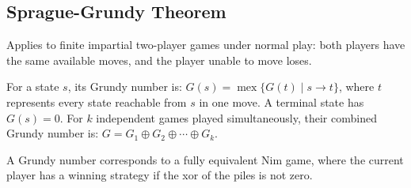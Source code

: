 \subsection{Sprague-Grundy Theorem}
Applies to finite impartial two-player games under normal play: both players have
the same available moves, and the player unable to move loses.

For a state $s$, its Grundy number is: $G(s) = \operatorname{mex}\{G(t) \mid s \rightarrow t\}$,
where $t$ represents every state reachable from $s$ in one move. A terminal state has $G(s) = 0$.
For $k$ independent games played simultaneously, their combined
Grundy number is:  $ G = G_1 \oplus G_2 \oplus \cdots \oplus G_k $.

A Grundy number corresponds to a fully equivalent Nim game, where the current player has
a winning strategy if the xor of the piles is not zero.
